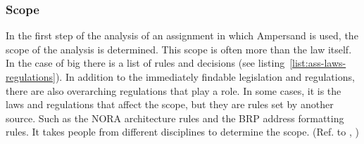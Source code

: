 \subsubsection{Scope}\label{subsub:3_scope}
In the first step of the analysis of an assignment in which Ampersand is used, the scope of the analysis is determined.
This scope is often more than the law itself.
In the case of \acrshort{big} there is a list of rules and decisions (see listing~\ref{list:ass-laws-regulations}).
In addition to the immediately findable legislation and regulations, there are also overarching regulations that play a role.
In some cases, it is the laws and regulations that affect the scope, but they are rules set by another source.
Such as the NORA architecture rules and the BRP address formatting rules.
It takes people from different disciplines to determine the scope.
(Ref. to , )